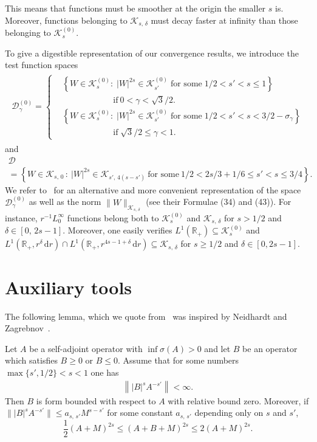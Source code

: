 \documentclass[AHL,Unicode,longabstracts,published]{cedram}
\newcommand*\dr{\mathrm{d}r}
\newcommand*\rz{\mathbb{R}}
\newcommand*\cD{\mathcal{D}}
\newcommand*\cK{\mathcal{K}}
\begin{document}
This means that functions must be smoother at the origin the smaller $s$ is. Moreover, functions belonging to $\cK_{s,\,\delta}$ must decay faster at infinity than those belonging to $\cK_{s}^{(0)}$.

To give a digestible representation of our convergence results, we introduce the test function spaces
\begin{align}\label{eq:deftestnod0}
\begin{split}
\cD_\gamma^{(0)} =
\begin{cases}
& \left\{ W\in\cK_{s}^{(0)}:\; |W|^{2s}\in\cK_{s'}^{(0)} \; \text{for some}\; 1/2<s'<s\leq 1 \right\} \\
& \qquad\qquad\qquad \text{if}\ 0<\gamma<\sqrt3/2.
\\
& \left\{ W\in\cK_{s}^{(0)}:\; |W|^{2s}\in\cK_{s'}^{(0)} \; \text{for some}\; 1/2<s'<s<3/2-\sigma_\gamma \right\} \\
& \qquad\qquad\qquad \text{if}\; \sqrt3/2\leq\gamma<1.
\end{cases}
\end{split}
\end{align}
and
\begin{multline}\label{eq:deftest0}
\cD \\
=\left\{W \in\cK_{s,\,0}\,:\ |W|^{2s}\in\cK_{s',\,4\left(s-s'\right)}\: \text{for some}\: 1/2<2s/3+1/6\leq s'<s\leq 3/4 \right\}.
\end{multline}
We refer to~\cite{Franketal2020P} for an alternative and more convenient representation of the space $\cD_\gamma^{(0)}$ as well as the norm $\|W\|_{\cK_{s,\,\delta}}$ (see their Formulae (34) and (43)). For instance, $r^{-1}L^\infty_0$ functions belong both to $\cK_{s}^{(0)}$ and $\cK_{s,\,\delta}$ for $s>1/2$ and $\delta\in[0,\,2s-1]$. Moreover, one easily verifies $L^1\left(\rz_+\right)\subseteq \cK_{s}^{(0)}$ and $L^1(\rz_+,r^\delta\,\dr)\cap L^1(\rz_+,r^{4s-1+\delta}\,\dr)\subseteq\cK_{s,\,\delta}$ for $s\geq1/2$ and $\delta\in[0,2s-1]$.



\section{Auxiliary tools}

The following lemma, which we quote from~\cite[Lemma~3.4]{Franketal2020P} was inspired by Neidhardt and Zagrebnov~\cite[Lemma~2.2]{NeidhardtZagrebnov1999}.

\begin{lemm}\label{apriori}
Let $A$ be a self-adjoint operator with $\inf\sigma(A)>0$ and let $B$ be an operator which satisfies $B\geq 0$ or $B\leq 0$. Assume that for some numbers $\max\{s',1/2\}<s<1$ one has
\begin{align*}
\left\||B|^s A^{-s'}\right\|<\infty.
\end{align*}
Then $B$ is form bounded with respect to $A$ with relative bound zero. Moreover, if $\||B|^s A^{-s'}\|\leq a_{s,\,s'}M^{s-s'}$ for some constant $a_{s,\,s'}$ depending only on $s$ and $s'$,
\[
\frac12 (A+M)^{2s} \leq (A+B+M)^{2s} \leq 2(A+M)^{2s}.
\]
\end{lemm}
\end{document}
